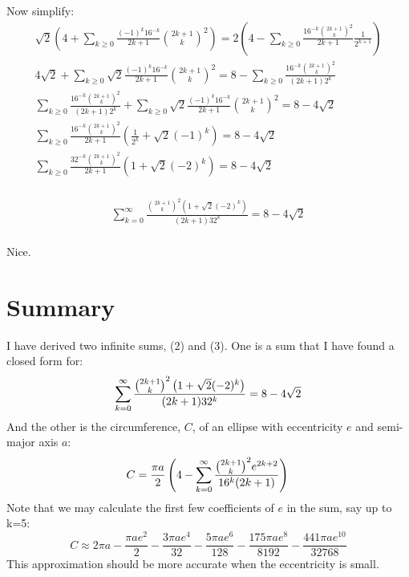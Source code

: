 \documentclass{article}
\begin{document}
Now simplify:
\begin{equation*}
\begin{split}
	\sqrt{2} \left( 4 +
	\sum_{k\geq 0} \frac{(-1)^{k}16^{-k}}{2k+1}{{2k+1}\choose k}^2\right)
	= 2\left(4-\sum_{k\geq 0}\frac{16^{-k}{{2k+1}\choose k}^2}{2k+1}\frac{1}{2^{k+1}}\right)\\
	4\sqrt2 +
	\sum_{k\geq 0} \sqrt2\frac{(-1)^{k}16^{-k}}{2k+1}{{2k+1}\choose k}^2
	= 8-\sum_{k\geq 0}\frac{16^{-k}{{2k+1}\choose k}^2}{(2k+1)2^k}\\
	\sum_{k\geq 0}\frac{16^{-k}{{2k+1}\choose k}^2}{(2k+1)2^k} +
	\sum_{k\geq 0} \sqrt2\frac{(-1)^{k}16^{-k}}{2k+1}{{2k+1}\choose k}^2
	= 8 - 4\sqrt2\\
	\sum_{k\geq 0} \frac{16^{-k}{{2k+1}\choose k}^2}{2k+1} \left(\frac{1}{2^k} +
	\sqrt2(-1)^{k} \right)
	= 8 - 4\sqrt2\\
	\sum_{k\geq 0} \frac{32^{-k}{{2k+1}\choose k}^2}{2k+1} \left(1 +
	\sqrt2(-2)^{k} \right)
	= 8 - 4\sqrt2\\
\end{split}
\end{equation*}
\begin{tcolorbox}
\begin{equation}
\begin{split}
	\sum_{k=0}^{\infty} \frac{{{2k+1}\choose k}^2\left(1+\sqrt2(-2)^{k} \right)}{(2k+1)32^k} 
	= 8 - 4\sqrt2\\
\end{split}
\end{equation}
\end{tcolorbox}
Nice.


\section{Summary}
I have derived two infinite sums, (2) and (3).
One is a sum that I have found a closed form for:
\begin{equation*}
	\sum_{k=0}^{\infty} \frac{{{2k+1}\choose k}^2\left(1+\sqrt2(-2)^{k} \right)}{(2k+1)32^k} 
	= 8 - 4\sqrt2\\
\end{equation*}
And the other is the circumference, $C$, of an ellipse with eccentricity $e$ and semi-major axis $a$:
\begin{equation*}
	C = \frac{\pi a}{2}\left(4-\sum_{k=0}^{\infty}\frac{{{2k+1}\choose k}^2e^{2k+2}}{16^k(2k+1)}\right)\\
\end{equation*}
Note that we may calculate the first few coefficients of $e$ in the sum, say up to k=5:
\begin{equation*}
	C \approx 2\pi a - 
	\frac{\pi a e^2}{2} - \frac{3\pi a e^4}{32} - \frac{5\pi a e^6}{128} - \frac{175\pi a e^8}{8192} - \frac{441\pi a e^{10}}{32768}
\end{equation*}
This approximation should be more accurate when the eccentricity is small.
\end{document}
